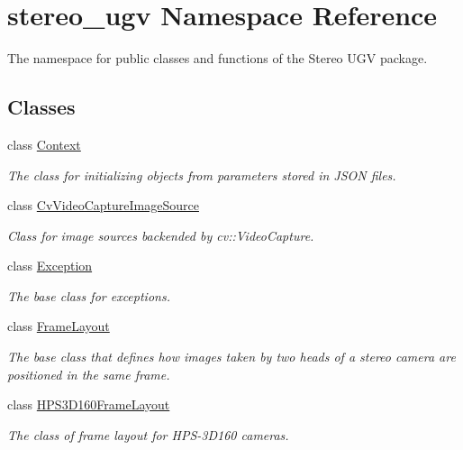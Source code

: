 \hypertarget{namespacestereo__ugv}{}\section{stereo\+\_\+ugv Namespace Reference}
\label{namespacestereo__ugv}


The namespace for public classes and functions of the Stereo U\+GV package.  


\subsection*{Classes}
\begin{DoxyCompactItemize}
\item 
class \hyperlink{classstereo__ugv_1_1Context}{Context}
\begin{DoxyCompactList}\small\item\em The class for initializing objects from parameters stored in J\+S\+ON files. \end{DoxyCompactList}\item 
class \hyperlink{classstereo__ugv_1_1CvVideoCaptureImageSource}{Cv\+Video\+Capture\+Image\+Source}
\begin{DoxyCompactList}\small\item\em Class for image sources backended by cv\+::\+Video\+Capture. \end{DoxyCompactList}\item 
class \hyperlink{classstereo__ugv_1_1Exception}{Exception}
\begin{DoxyCompactList}\small\item\em The base class for exceptions. \end{DoxyCompactList}\item 
class \hyperlink{classstereo__ugv_1_1FrameLayout}{Frame\+Layout}
\begin{DoxyCompactList}\small\item\em The base class that defines how images taken by two heads of a stereo camera are positioned in the same frame. \end{DoxyCompactList}\item 
class \hyperlink{classstereo__ugv_1_1HPS3D160FrameLayout}{H\+P\+S3\+D160\+Frame\+Layout}
\begin{DoxyCompactList}\small\item\em The class of frame layout for H\+P\+S-\/3\+D160 cameras. \end{DoxyCompactList}\item 

\end{DoxyCompactItemize}
